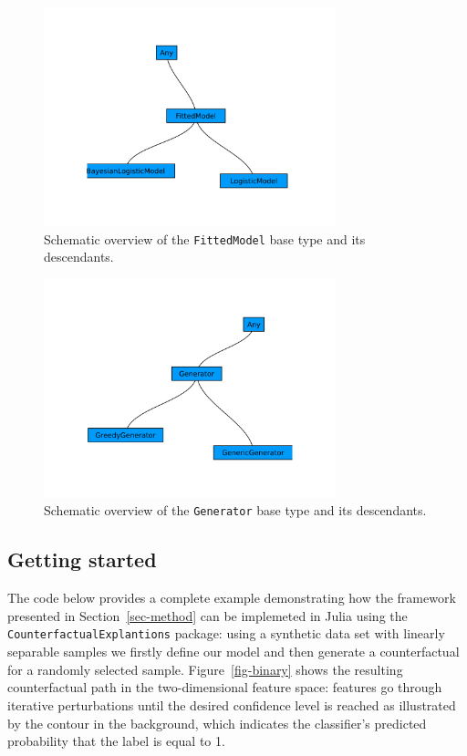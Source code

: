 \documentclass[
  letterpaper,
  DIV=11,
  numbers=noendperiod]{scrartcl}
\begin{document}
\begin{figure}

{\centering \includegraphics[width=3.33333in,height=2.5in]{www/models.png}

}

\caption{\label{fig-models}Schematic overview of the
\texttt{FittedModel} base type and its descendants.}

\end{figure}

\begin{figure}

{\centering \includegraphics[width=3.33333in,height=2.5in]{www/generators.png}

}

\caption{\label{fig-generators}Schematic overview of the
\texttt{Generator} base type and its descendants.}

\end{figure}

\hypertarget{sec-start}{%
\subsection{Getting started}\label{sec-start}}

The code below provides a complete example demonstrating how the
framework presented in Section~\ref{sec-method} can be implemeted in
Julia using the \texttt{CounterfactualExplantions} package: using a
synthetic data set with linearly separable samples we firstly define our
model and then generate a counterfactual for a randomly selected sample.
Figure~\ref{fig-binary} shows the resulting counterfactual path in the
two-dimensional feature space: features go through iterative
perturbations until the desired confidence level is reached as
illustrated by the contour in the background, which indicates the
classifier's predicted probability that the label is equal to 1.
\end{document}
